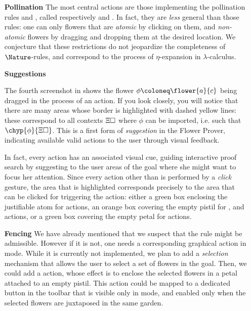 \begin{itemize}
  \item[\textbf{Pollination}] The most central actions are those implementing
  the pollination rules  and , called respectively
   and . In fact, they are \emph{less} general
  than those rules: one can only  flowers that are \emph{atomic}
  by clicking on them, and  \emph{non-atomic} flowers by dragging
  and dropping them at the desired location. We conjecture that these
  restrictions do not jeopardize the completeness of $\Nature$-rules, and
  correspond to the process of $\eta$-expansion in $\lambda$-calculus.
  
  \item[\textbf{Suggestions}]
  
  The fourth screenshot in  shows the flower $\phi
  \deq \flower{a}{c}$ being dragged in the process of an  action.
  If you look closely, you will notice that there are many areas whose border is
  highlighted with dashed yellow lines: these correspond to all contexts
  $\Xi\square$ where $\phi$ can be imported, i.e. such that
  $\chyp{\phi}{\Xi\hole}$. This is a first form of \emph{suggestion} in the
  Flower Prover, indicating available valid actions to the user through visual
  feedback.

  In fact, every \Proof action has an associated visual cue, guiding interactive
  proof search by suggesting to the user areas of the goal where she might want
  to focus her attention. Since every action other than  is
  performed by a \emph{click} gesture, the area that is highlighted corresponds
  precisely to the area that can be clicked for triggering the action: either a
  green box enclosing the justifiable atom for  actions, an
  orange box covering the empty pistil for ,  and
   actions, or a green box covering the empty petal for
   actions.
  
  \item[\textbf{Fencing}] We have already mentioned that we suspect that the
   rule might be admissible. However if it is not, one needs a
  corresponding graphical action in \Proof mode. While it is currently not
  implemented, we plan to add a \emph{selection} mechanism that allows the user
  to select a set of flowers in the goal. Then, we could add a 
  action, whose effect is to enclose the selected flowers in a petal attached to
  an empty pistil. This action could be mapped to a dedicated button in the
  toolbar that is visible only in \Proof mode, and enabled only when the
  selected flowers are juxtaposed in the same garden.
\end{itemize}

